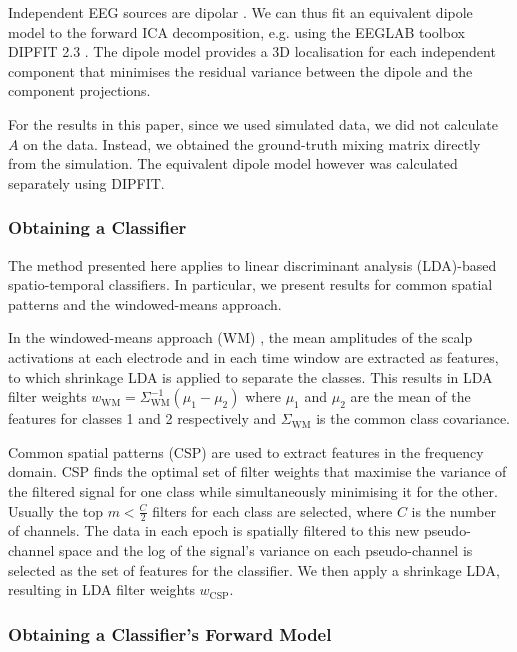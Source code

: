 Independent EEG sources are dipolar \cite{delorme2012dipolar}. We can thus fit an equivalent dipole model to the forward ICA decomposition, e.g. using the EEGLAB toolbox DIPFIT 2.3 \cite{oostenveld2003dipfit}. The dipole model provides a 3D localisation for each independent component that minimises the residual variance between the dipole and the component projections.

For the results in this paper, since we used simulated data, we did not calculate $A$ on the data. Instead, we obtained the ground-truth mixing matrix directly from the simulation. The equivalent dipole model however was calculated separately using DIPFIT.


\subsubsection{Obtaining a Classifier}

The method presented here applies to linear discriminant analysis (LDA)-based spatio-temporal classifiers. In particular, we present results for common spatial patterns and the windowed-means approach.

In the windowed-means approach (WM) \cite{blankertz2011}, the mean amplitudes of the scalp activations at each electrode and in each time window are extracted as features, to which shrinkage LDA is applied to separate the classes. This results in LDA filter weights  $w_\textrm{WM}=\Sigma_\textrm{WM}^{-1}(\mu_{1}-\mu_{2})$ where $\mu_{1}$ and $\mu_{2}$ are the mean of the features for classes 1 and 2 respectively and $\Sigma_\textrm{WM}$ is the common class covariance.

Common spatial patterns (CSP) \cite{ramoser2000} are used to extract features in the frequency domain. CSP finds the optimal set of filter weights that maximise the variance of the filtered signal for one class while simultaneously minimising it for the other. Usually the top $m < \frac{C}{2}$ filters for each class are selected, where $C$ is the number of channels. The data in each epoch is spatially filtered to this new pseudo-channel space and the log of the signal's variance on each pseudo-channel is selected as the set of features for the classifier. We then apply a shrinkage LDA, resulting in LDA filter weights $w_\textrm{CSP}$. 


\subsubsection{Obtaining a Classifier's Forward Model}

